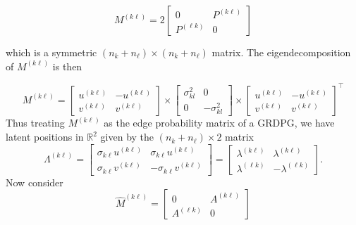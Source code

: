 \documentclass[12pt]{article}
\begin{document}
\[M^{(k \ell)} = 2 \begin{bmatrix} 0 & P^{(k \ell)} \\ P^{(\ell k)} & 0 \end{bmatrix}\]

which is a symmetric \((n_k + n_\ell) \times (n_k + n_\ell)\) matrix. The
eigendecomposition of \(M^{(k \ell)}\) is then

\[M^{(k \ell)} = 
\begin{bmatrix} u^{(k \ell)} & -u^{(k \ell)} \\ v^{(k \ell)} & v^{(k \ell)} \end{bmatrix} \times 
\begin{bmatrix} \sigma^2_{kl} & 0 \\ 0 & -\sigma^2_{kl} \end{bmatrix} \times
\begin{bmatrix} u^{(k \ell)} & -u^{(k \ell)} \\ v^{(k \ell)} & v^{(k \ell)} \end{bmatrix}^\top\]
Thus treating \(M^{(k \ell)}\) as the edge probability matrix of a GRDPG, we
have latent positions in \(\mathbb{R}^2\) given by the $(n_k + n_{\ell}) \times 2$ matrix
\[\Lambda^{(k \ell)} = \begin{bmatrix} 
  \sigma_{k \ell} u^{(k \ell)} & \sigma_{k \ell} u^{(k \ell)} \\ 
  \sigma_{k \ell} v^{(k \ell)} & -\sigma_{k \ell} v^{(k \ell)} 
\end{bmatrix} = 
\begin{bmatrix} 
  \lambda^{(k \ell)} & \lambda^{(k \ell)} \\ 
  \lambda^{( \ell k)} & -\lambda^{( \ell k)} 
\end{bmatrix}.\]
Now consider
\[\hat{M}^{(k \ell)} = \begin{bmatrix} 0 & A^{(k \ell)} \\ A^{(\ell k)} & 0 \end{bmatrix}\]

\end{document}

